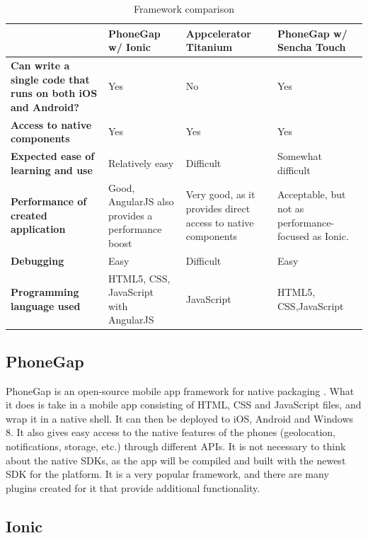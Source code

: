\begin{table}[!h]
	\caption{Framework comparison}
		\begin{tabular}{ | p{6cm} | >{\raggedright}p{3cm} | >{\raggedright}p{3cm} | p{4cm} |}
			\hline
			\textbf{} & \textbf{PhoneGap w/ Ionic} & \textbf{Appcelerator Titanium} & \textbf{PhoneGap w/ Sencha Touch} \\ \hline
			\textbf{Can write a single code that runs on both iOS and Android?} & Yes & No & Yes \\ \hline
			\textbf{Access to native components} & Yes & Yes & Yes \\ \hline
			\textbf{Expected ease of learning and use} & Relatively easy & Difficult & Somewhat difficult \\ \hline
			\textbf{Performance of created application} & Good, AngularJS also provides a performance boost & Very good, as it provides direct access to native components & Acceptable, but not as performance- focused as Ionic. \\ \hline
			\textbf{Debugging} & Easy & Difficult & Easy \\ \hline
			\textbf{Programming language used} & HTML5, CSS, JavaScript with AngularJS & JavaScript & HTML5, CSS,\newline JavaScript \\ \hline
		\end{tabular}
	\label{Tab:framework}
\end{table}

\subsection{PhoneGap}
\label{subsec:phonegap}

PhoneGap is an open-source mobile app framework for native packaging \cite{RA2}. What it does is take in a mobile app consisting of HTML, CSS and JavaScript files, and wrap it in a native shell. It can then be deployed to iOS, Android and Windows 8. It also gives easy access to the native features of the phones (geolocation, notifications, storage, etc.) through different APIs. It is not necessary to think about the native SDKs, as the app will be compiled and built with the newest SDK for the platform.  It is a very popular framework, and there are many plugins created for it that provide additional functionality.

\subsection{Ionic}
\label{subsec:ionic}

